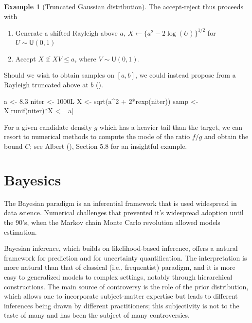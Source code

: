 \documentclass[
  11pt,
  letterpaper,
]{scrbook}
\newenvironment{Shaded}{\begin{snugshade}}{\end{snugshade}}
\newcommand{\DecValTok}[1]{\textcolor[rgb]{0.68,0.00,0.00}{#1}}
\newcommand{\FloatTok}[1]{\textcolor[rgb]{0.68,0.00,0.00}{#1}}
\newcommand{\FunctionTok}[1]{\textcolor[rgb]{0.28,0.35,0.67}{#1}}
\newcommand{\NormalTok}[1]{\textcolor[rgb]{0.00,0.23,0.31}{#1}}
\newcommand{\OtherTok}[1]{\textcolor[rgb]{0.00,0.23,0.31}{#1}}
\newcommand{\SpecialCharTok}[1]{\textcolor[rgb]{0.37,0.37,0.37}{#1}}
\providecommand{\tightlist}{%
  \setlength{\itemsep}{0pt}\setlength{\parskip}{0pt}}\usepackage{longtable,booktabs,array}
\theoremstyle{definition}
\theoremstyle{definition}
\newtheorem{example}{Example}[chapter]
\theoremstyle{definition}
\theoremstyle{plain}
\theoremstyle{plain}
\theoremstyle{remark}
\begin{document}
\begin{example}[Truncated Gaussian
distribution]
The accept-reject thus proceeds with

\begin{enumerate}
\def\labelenumi{\arabic{enumi}.}
\tightlist
\item
  Generate a shifted Rayleigh above \(a\),
  \(X \gets  \{a^2 - 2\log(U)\}^{1/2}\) for \(U \sim \mathsf{U}(0,1)\)
\item
  Accept \(X\) if \(XV \leq a\), where \(V \sim \mathsf{U}(0,1)\).
\end{enumerate}

Should we wish to obtain samples on \([a,b]\), we could instead propose
from a Rayleigh truncated above at \(b\)
().

\begin{Shaded}
\begin{Highlighting}[]
\NormalTok{a }\OtherTok{\textless{}{-}} \FloatTok{8.3}
\NormalTok{niter }\OtherTok{\textless{}{-}} \DecValTok{1000}\NormalTok{L}
\NormalTok{X }\OtherTok{\textless{}{-}} \FunctionTok{sqrt}\NormalTok{(a}\SpecialCharTok{\^{}}\DecValTok{2} \SpecialCharTok{+} \DecValTok{2}\SpecialCharTok{*}\FunctionTok{rexp}\NormalTok{(niter))}
\NormalTok{samp }\OtherTok{\textless{}{-}}\NormalTok{ X[}\FunctionTok{runif}\NormalTok{(niter)}\SpecialCharTok{*}\NormalTok{X }\SpecialCharTok{\textless{}=}\NormalTok{ a]}
\end{Highlighting}
\end{Shaded}

\end{example}

For a given candidate density \(g\) which has a heavier tail than the
target, we can resort to numerical methods to compute the mode of the
ratio \(f/g\) and obtain the bound \(C\); see Albert
(), Section 5.8 for an insightful
example.


\chapter{Bayesics}\label{bayesics}

The Bayesian paradigm is an inferential framework that is used
widespread in data science. Numerical challenges that prevented it's
widespread adoption until the 90's, when the Markov chain Monte Carlo
revolution allowed models estimation.

Bayesian inference, which builds on likelihood-based inference, offers a
natural framework for prediction and for uncertainty quantification. The
interpretation is more natural than that of classical (i.e.,
frequentist) paradigm, and it is more easy to generalized models to
complex settings, notably through hierarchical constructions. The main
source of controversy is the role of the prior distribution, which
allows one to incorporate subject-matter expertise but leads to
different inferences being drawn by different practitioners; this
subjectivity is not to the taste of many and has been the subject of
many controversies.
\end{document}
